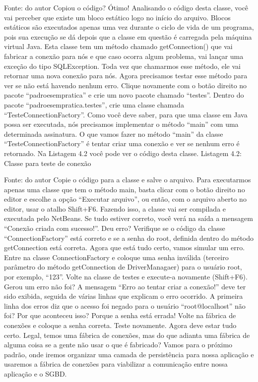 Fonte: do autor
Copiou o código? Ótimo! Analisando o código desta classe, você vai perceber que existe um bloco estático logo no início do arquivo. Blocos estáticos são executados apenas uma vez durante o ciclo de vida de um programa, pois sua execução se dá depois que a classe em questão é carregada pela máquina virtual Java. Esta classe tem um método chamado getConnection() que vai fabricar a conexão para nós e que caso ocorra algum problema, vai lançar uma exceção do tipo SQLException. Toda vez que chamarmos esse método, ele vai retornar uma nova conexão para nós. 
Agora precisamos testar esse método para ver se não está havendo nenhum erro. Clique novamente com o botão direito no pacote “padroesempratica” e crie um novo pacote chamado “testes”. Dentro do pacote “padroesempratica.testes”, crie uma classe chamada “TesteConnectionFactory”. Como você deve saber, para que uma classe em Java possa ser executada, nós precisamos implementar o método “main” com uma determinada assinatura. O que vamos fazer no método “main” da classe “TesteConnectionFactory” é tentar criar uma conexão e ver se nenhum erro é retornado. Na Listagem 4.2 você pode ver o código desta classe.
Listagem 4.2: Classe para teste de conexão
 
Fonte: do autor
Copie o código para a classe e salve o arquivo. Para executarmos apenas uma classe que tem o método main, basta clicar com o botão direito no editor e escolhe a opção “Executar arquivo”, ou então, com o arquivo aberto no editor, usar o atalho Shift+F6. Fazendo isso, a classe vai ser compilada e executada pelo NetBeans. Se tudo estiver correto, você verá na saída a mensagem “Conexão criada com sucesso!”. Deu erro? Verifique se o código da classe “ConnectionFactory” está correto e se a senha do root, definida dentro do método getConnection está correta. Agora que está tudo certo, vamos simular um erro. Entre na classe ConnectionFactory e coloque uma senha inválida (terceiro parâmetro do método getConnection de DriverManagaer) para o usuário root, por exemplo, “123”. Volte na classe de testes e execute-a novamente (Shift+F6). Gerou um erro não foi? A mensagem “Erro ao tentar criar a conexão!” deve ter sido exibida, seguida de várias linhas que explicam o erro ocorrido. A primeira linha dos erros diz que o acesso foi negado para o usuário “root@localhost” não foi? Por que aconteceu isso? Porque a senha está errada! Volte na fábrica de conexões e coloque a senha correta. Teste novamente. Agora deve estar tudo certo.
Legal, temos uma fábrica de conexões, mas do que adianta uma fábrica de alguma coisa se a gente não usar o que é fabricado? Vamos para o próximo padrão, onde iremos organizar uma camada de persistência para nossa aplicação e usaremos a fábrica de conexões para viabilizar a comunicação entre nossa aplicação e o SGBD.


